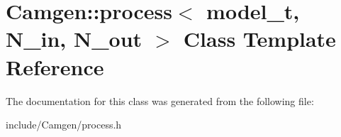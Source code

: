 \hypertarget{a00435}{}\section{Camgen\+:\+:process$<$ model\+\_\+t, N\+\_\+in, N\+\_\+out $>$ Class Template Reference}
\label{a00435}


The documentation for this class was generated from the following file\+:\begin{DoxyCompactItemize}
\item 
include/\+Camgen/process.\+h\end{DoxyCompactItemize}
